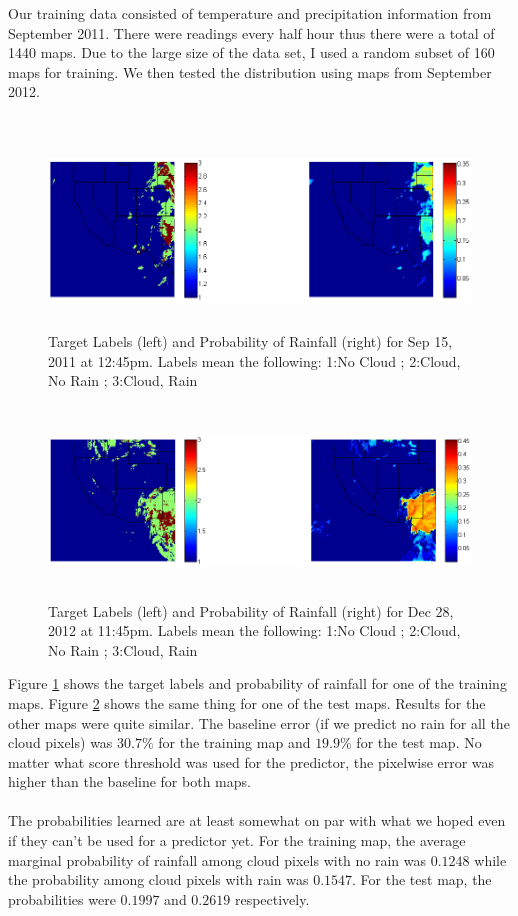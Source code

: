 Our training data consisted of temperature and precipitation information from September 2011. There were readings every half hour thus there were a total of 1440 maps. Due to the large size of the data set, I used a random subset of 160 maps for training. We then tested the distribution using maps from September 2012. \\
\\
\begin{figure}[t]
\centering
\includegraphics[height=2in]{./zackWriteUp/time698_sep2011_labelAndProb.png}
\caption{Target Labels (left) and Probability of Rainfall (right) for Sep 15, 2011 at 12:45pm. Labels mean the following: 1:No Cloud ; 2:Cloud, No Rain ; 3:Cloud, Rain}
\label{labelProb2}
\end{figure}
\begin{figure}[t]
\centering
\includegraphics[height=2in]{./zackWriteUp/time1196_labelAndProb.png}
\caption{Target Labels (left) and Probability of Rainfall (right) for Dec 28, 2012 at 11:45pm. Labels mean the following: 1:No Cloud ; 2:Cloud, No Rain ; 3:Cloud, Rain}
\label{labelProb}
\end{figure}
Figure \ref{labelProb2} shows the target labels and probability of rainfall for one of the training maps. Figure \ref{labelProb} shows the same thing for one of the test maps. Results for the other maps were quite similar. The baseline error (if we predict no rain for all the cloud pixels) was $30.7\%$ for the training map and $19.9\%$ for the test map. No matter what score threshold was used for the predictor, the pixelwise error was higher than the baseline for both maps. \\
\\
The probabilities learned are at least somewhat on par with what we hoped even if they can't be used for a predictor yet. For the training map, the average marginal probability of rainfall among cloud pixels with no rain was $0.1248$ while the probability among cloud pixels with rain was $0.1547$. For the test map, the probabilities were $0.1997$ and $0.2619$ respectively.  


